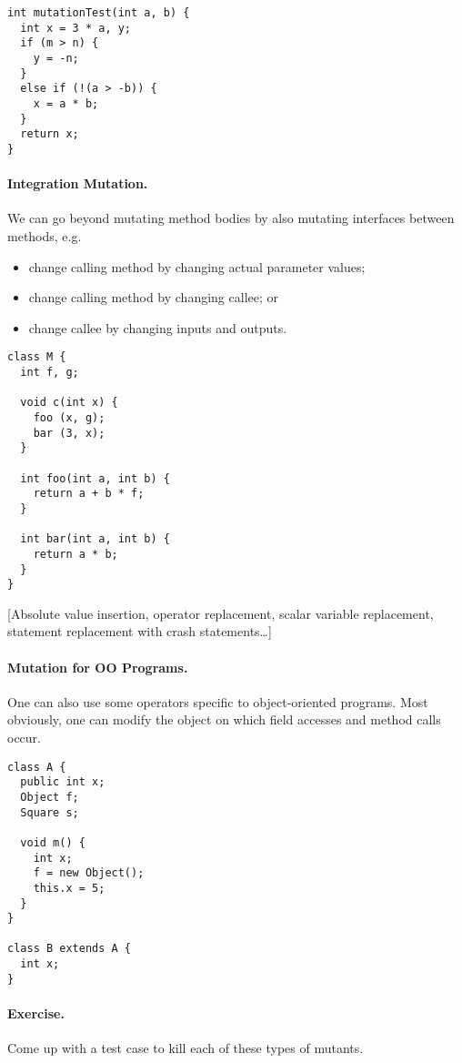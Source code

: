 \documentclass[11pt]{article}
\begin{document}
{ \Large
\begin{lstlisting}
int mutationTest(int a, b) { 
  int x = 3 * a, y;
  if (m > n) {
    y = -n;
  }
  else if (!(a > -b)) {
    x = a * b;
  }
  return x;
}
\end{lstlisting}
}

\paragraph{Integration Mutation.} We can go beyond mutating method bodies
by also mutating interfaces between methods, e.g.
\begin{itemize}
\item change calling method by changing actual parameter values;
\item change calling method by changing callee; or
\item change callee by changing inputs and outputs.
\end{itemize}

{
\begin{lstlisting}
class M {
  int f, g;

  void c(int x) {
    foo (x, g);
    bar (3, x);
  }

  int foo(int a, int b) {
    return a + b * f;
  }

  int bar(int a, int b) {
    return a * b;
  }
}
\end{lstlisting}
}

[Absolute value insertion, operator replacement, scalar variable replacement,
  statement replacement with crash statements\ldots]

\paragraph{Mutation for OO Programs.} One can also use some operators specific
to object-oriented programs. Most obviously, one can modify the object on
which field accesses and method calls occur.

{\small
\begin{lstlisting}
class A {
  public int x;
  Object f;
  Square s;

  void m() {
    int x;
    f = new Object();
    this.x = 5;
  }
}

class B extends A {
  int x;
}
\end{lstlisting}
}

\vspace*{-1em}
\paragraph{Exercise.} Come up with a test case to kill each of these types of
mutants.
\end{document}
